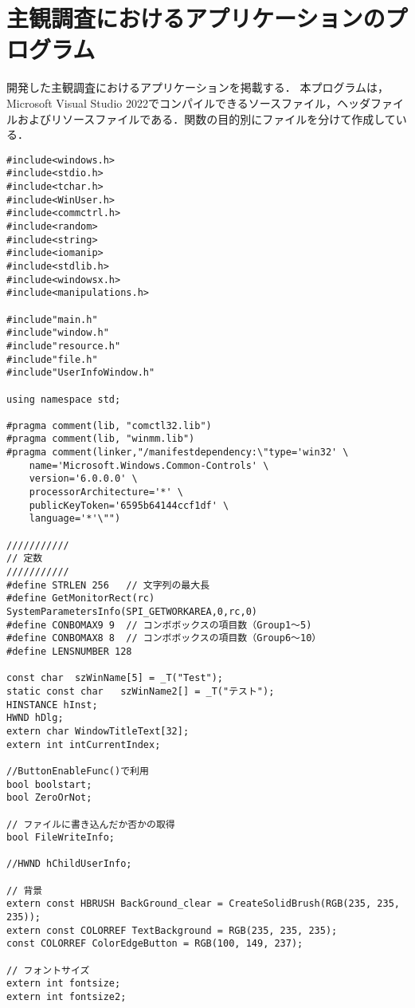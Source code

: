 \chapter{主観調査におけるアプリケーションのプログラム}
開発した主観調査におけるアプリケーションを掲載する．
本プログラムは，Microsoft Visual Studio 2022でコンパイルできるソースファイル，ヘッダファイルおよびリソースファイルである．関数の目的別にファイルを分けて作成している．

\begin{lstlisting}[caption=main.cpp]
#include<windows.h>
#include<stdio.h>
#include<tchar.h>
#include<WinUser.h>
#include<commctrl.h> 
#include<random>
#include<string>
#include<iomanip>
#include<stdlib.h>
#include<windowsx.h>
#include<manipulations.h> 

#include"main.h"
#include"window.h"
#include"resource.h"
#include"file.h"
#include"UserInfoWindow.h"

using namespace std;

#pragma comment(lib, "comctl32.lib")
#pragma comment(lib, "winmm.lib")
#pragma comment(linker,"/manifestdependency:\"type='win32' \
	name='Microsoft.Windows.Common-Controls' \
	version='6.0.0.0' \
	processorArchitecture='*' \
	publicKeyToken='6595b64144ccf1df' \
	language='*'\"") 

///////////
// 定数
///////////
#define STRLEN 256   // 文字列の最大長
#define GetMonitorRect(rc)  SystemParametersInfo(SPI_GETWORKAREA,0,rc,0)  
#define CONBOMAX9 9  // コンボボックスの項目数（Group1～5)
#define CONBOMAX8 8  // コンボボックスの項目数（Group6～10）
#define LENSNUMBER 128

const char	szWinName[5] = _T("Test");
static const char   szWinName2[] = _T("テスト");
HINSTANCE hInst;
HWND hDlg;
extern char WindowTitleText[32];
extern int intCurrentIndex;

//ButtonEnableFunc()で利用
bool boolstart;
bool ZeroOrNot;  

// ファイルに書き込んだか否かの取得
bool FileWriteInfo;

//HWND hChildUserInfo;

// 背景
extern const HBRUSH BackGround_clear = CreateSolidBrush(RGB(235, 235, 235));
extern const COLORREF TextBackground = RGB(235, 235, 235);
const COLORREF ColorEdgeButton = RGB(100, 149, 237);

// フォントサイズ
extern int fontsize;   
extern int fontsize2;


\end{lstlisting}
